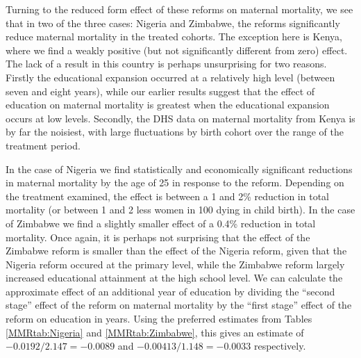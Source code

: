 \documentclass{article}[12pt,subeqn]
\begin{document}
\begin{spacing}{1.4}
Turning to the reduced form effect of these reforms on maternal mortality, we see 
that in two of the three cases: Nigeria and Zimbabwe, the reforms significantly 
reduce maternal mortality in the treated cohorts. The exception here is Kenya,
where we find a weakly positive (but not significantly different from zero) effect.  
The lack of a result in this country is perhaps unsurprising for two reasons.  
Firstly the educational expansion occurred at a relatively high level (between 
seven and eight years), while our earlier results suggest that the effect of 
education on maternal mortality is greatest when the educational expansion occurs 
at low levels.  Secondly, the DHS data on maternal mortality from Kenya is by far 
the noisiest, with large fluctuations by birth cohort over the range of the 
treatment period.

In the case of Nigeria we find statistically and economically significant 
reductions in maternal mortality by the age of 25 in response to the reform.  
Depending on the treatment examined, the effect is between a 1 and 2\% reduction 
in total mortality (or between 1 and 2 less women in 100 dying in child birth).  
In the case of Zimbabwe we find a slightly smaller effect of a 0.4\% reduction in 
total mortality.  Once again, it is perhaps not surprising that the effect of the 
Zimbabwe reform is smaller than the effect of the Nigeria reform, given that the 
Nigeria reform occured at the primary level, while the Zimbabwe reform largely 
increased educational attainment at the high school level.  We can calculate the 
approximate effect of an additional year of education by dividing the 
``second stage'' effect of the reform on maternal mortality by the ``first stage'' 
effect of the reform on education in years.  Using the preferred estimates from 
Tables \ref{MMRtab:Nigeria} and \ref{MMRtab:Zimbabwe}, this gives an estimate of 
$-0.0192/2.147=-0.0089$ and $-0.00413/1.148=-0.0033$ respectively.


\end{spacing}
\end{document}
